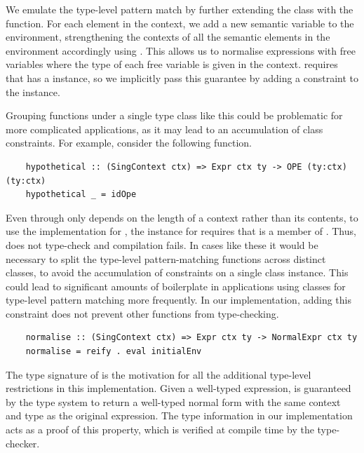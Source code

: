 We emulate the type-level pattern match by further extending the  class with the  function. 
For each element in the context, we add a new semantic variable to the environment, strengthening the contexts of all the semantic elements in the environment accordingly using . This allows us to normalise expressions with free variables where the type of each free variable is given in the context.  requires that  has a  instance, so we implicitly pass this guarantee by adding a  constraint to the instance. 

Grouping functions under a single type class like this could be problematic for more complicated applications, as it may lead to an accumulation of class constraints. For example, consider the following  function.

\begin{lstlisting}
    hypothetical :: (SingContext ctx) => Expr ctx ty -> OPE (ty:ctx) (ty:ctx)
    hypothetical _ = idOpe
\end{lstlisting}

Even through  only depends on the length of a context rather than its contents, to use the  implementation for , the \code{(:)} instance for  requires that  is a member of . Thus,  does not type-check and compilation fails. In cases like these it would be necessary to split the type-level pattern-matching functions across distinct classes, to avoid the accumulation of constraints on a single class instance. This could lead to significant amounts of boilerplate in applications using classes for type-level pattern matching more frequently. In our implementation, adding this constraint does not prevent other functions from type-checking. 

\begin{lstlisting}
    normalise :: (SingContext ctx) => Expr ctx ty -> NormalExpr ctx ty
    normalise = reify . eval initialEnv
\end{lstlisting}

The type signature of  is the motivation for all the additional type-level restrictions in this implementation. Given a well-typed expression,  is guaranteed by the type system to return a well-typed normal form with the same context and type as the original expression. The type information in our implementation acts as a proof of this property, which is verified at compile time by the type-checker.

